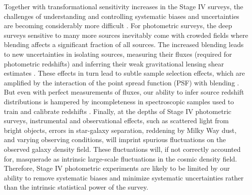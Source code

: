 \documentclass[a4paper,11pt]{article}
\begin{document}
  Together with transformational sensitivity increases in the Stage IV surveys, the challenges of understanding and controlling systematic biases and uncertainties are becoming considerably more difficult \cite{1808.07335}. For photometric surveys, the deep surveys sensitive to many more sources inevitably come with crowded fields where blending affects a significant fraction of all sources. The increased blending leads to new uncertainties in isolating sources, measuring their fluxes (required for photometric redshifts) and inferring their weak gravitational lensing shear estimates \citep{2016ApJ...816...11D,2018MNRAS.475.4524S,2019MNRAS.483.2487J}. These effects in turn lead to subtle sample selection effects, which are amplified by the interaction of the point spread function (PSF) with blending \cite{1708.01533,1905.01324,1907.10572}. But even with perfect measurements of fluxes, our ability to infer source redshift distributions is hampered by incompleteness in spectroscopic samples used to train and calibrate redshifts \cite{1903.09325}. Finally, at the depths of Stage IV photometric surveys, instrumental and observational effects, such as scattered light from bright objects, errors in star-galaxy separation, reddening by Milky Way dust, and varying observing conditions, will imprint spurious fluctuations on the observed galaxy density field. These fluctuations will, if not correctly accounted for, masquerade as intrinsic large-scale fluctuations in the cosmic density field. Therefore, Stage IV photometric experiments are likely to be limited by our ability to remove systematic biases and minimize systematic uncertainties rather than the intrinsic statistical power of the survey.
\end{document}
